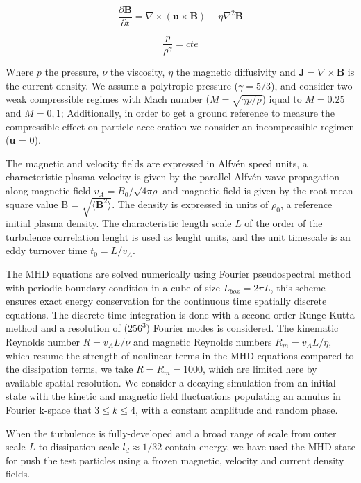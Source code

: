 \documentclass[%
aip,pop,amsmath,amssymb,
 reprint,%
]{revtex4-1}
\begin{document}
\begin{equation}
\frac{\partial \textbf{B}}{\partial t} = \nabla \times (\textbf{u} \times \textbf{B}) + \eta \nabla^2 \textbf{B}
\end{equation}

\begin{equation}
 \frac{p}{\rho^{\gamma}} = cte
\end{equation}


Where $p$ the pressure, $\nu$ the viscosity, $\eta$ the magnetic diffusivity and
$\textbf{J}=\nabla \times \textbf{B} $ is the current density. We assume a polytropic 
pressure ($\gamma=5/3$), and consider two weak compressible regimes with Mach number
($M= \sqrt{\gamma p/\rho}$) iqual to $M=0.25$ and $M=0,1$; Additionally, in order to get 
a ground reference to measure the compressible effect on particle acceleration we consider an
incompressible regimen (\nabla \cdot \textbf{u} = 0).

The magnetic and velocity fields are expressed in Alfv\'en speed units, a characteristic 
plasma velocity is given by the parallel Alfv\'en wave propagation along magnetic 
field $v_A = B_0/\sqrt{4\pi\rho}$ and magnetic field is given by the root mean square 
value \delta B = $\sqrt{\langle\textbf{B}^2\rangle}$. The density is expressed in units 
of $\rho_0$, a reference initial plasma density. The characteristic length scale $L$ of the
order of the turbulence correlation lenght is used as lenght units, and the unit timescale
is an eddy turnover time $t_0=L/v_A$.

The MHD equations are solved numerically using Fourier pseudospectral method with periodic 
boundary condition in a cube of size  $L_{box}=2\pi L$, this scheme ensures exact energy 
conservation for the continuous time spatially discrete equations. The discrete time 
integration is done with a second-order Runge-Kutta method and a  resolution of ($256^3$) 
Fourier modes is considered. The kinematic Reynolds number $R=v_AL/\nu$ and magnetic Reynolds
numbers $R_m=v_AL/\eta$, which resume the strength of nonlinear terms in the MHD equations 
compared to the dissipation terms, we take $R=R_m= 1000$, which are limited here by available
spatial resolution. We consider a decaying simulation from an initial state with the kinetic 
and magnetic field fluctuations populating an annulus in Fourier k-space that
$ 3\leq k \leq4$, with a constant amplitude and random phase.

When the turbulence is fully-developed and a broad range of scale from outer scale $L$ to 
dissipation scale $l_d\approx 1/32$ contain energy, we have used the MHD state for push the test
particles using a frozen magnetic, velocity and current density fields.
\end{document}

